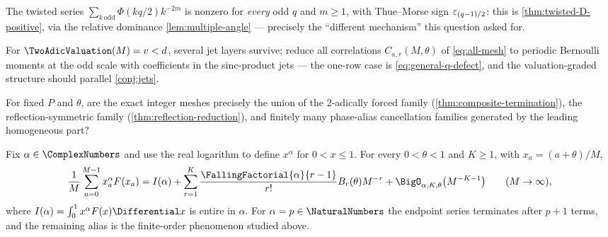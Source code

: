 \begin{remark}
\label{q:twisted-D-positivity}
The twisted series $\sum_{k\,\mathrm{odd}}\Phi(kq/2)k^{-2m}$ is
nonzero for \emph{every} odd $q$ and $m\ge1$, with Thue--Morse sign
$\varepsilon_{(q-1)/2}$: this is \cref{thm:twisted-D-positive}, via the
relative dominance \cref{lem:multiple-angle} --- precisely the
``different mechanism'' this question asked for.
\end{remark}

\begin{question}
\label{q:defect-hierarchy}
For $\TwoAdicValuation(M)=v<d$, several jet layers survive; reduce all
correlations $C_{a,r}(M,\theta)$ of \eqref{eq:all-mesh} to periodic
Bernoulli moments at the odd scale with coefficients in the
sinc-product jets --- the one-row case is
\eqref{eq:general-q-defect}, and the valuation-graded structure
should parallel \cref{conj:jets}.
\end{question}

\begin{question}
\label{q:mesh-classification}
For fixed $P$ and $\theta$, are the exact integer meshes precisely the
union of the $2$-adically forced family
(\cref{thm:composite-termination}), the reflection-symmetric family
(\cref{thm:reflection-reduction}), and finitely many phase-alias
cancellation families generated by the leading homogeneous part?
\end{question}

\begin{proposition}
\label{prop:complex-alpha-EM}
Fix $\alpha\in\ComplexNumbers$ and use the real logarithm to define
$x^\alpha$ for $0<x\le1$.  For every $0<\theta<1$ and $K\ge1$, with
$x_a=(a+\theta)/M$,
\begin{equation}
 \frac1M\sum_{a=0}^{M-1}x_a^{\alpha}F(x_a)
 =I(\alpha)
 +\sum_{r=1}^{K}\frac{\FallingFactorial{\alpha}{r-1}}{r!}B_r(\theta)M^{-r}
 +\BigO_{\alpha,K,\theta}\bigl(M^{-K-1}\bigr)
 \qquad(M\to\infty),
 \label{eq:complex-alpha-EM}
\end{equation}
where
$I(\alpha)=\int_0^1x^\alpha F(x)\Differential x$ is entire in $\alpha$.
For $\alpha=p\in\NaturalNumbers$ the endpoint series terminates after
$p+1$ terms, and the remaining alias is the finite-order phenomenon
studied above.
\end{proposition}

